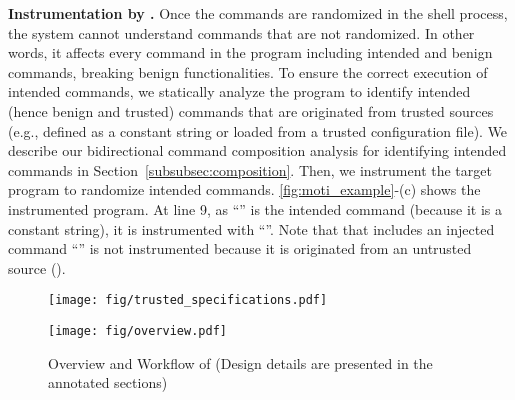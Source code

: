 \noindent
{\bf Instrumentation by \sysname.}
Once the commands are randomized in the shell process, the system cannot understand commands that are not randomized. In other words, it affects every command in the program including intended and benign commands, breaking benign functionalities.
To ensure the correct execution of intended commands, we statically analyze the program to identify intended (hence benign and trusted) commands that are originated from trusted sources (e.g., defined as a constant string or loaded from a trusted configuration file). We describe our bidirectional command composition analysis for identifying intended commands in Section~\ref{subsubsec:composition}. 
Then, we instrument the target program to randomize intended commands.
\autoref{fig:moti_example}-(c) shows the instrumented program. At line 9, as ``'' is the intended command (because it is a constant string), it is  instrumented with ``''. Note that  that includes an injected command ``'' is not instrumented because it is originated from an untrusted source (). %


\begin{figure}[h]
    \centering
    \vspace{1em}
    \texttt{[image: fig/trusted\_specifications.pdf]}
    \vspace{-1em}
    \caption{}
    \vspace{-1em}
    \label{fig:spec_example}
\end{figure}



\begin{figure*}[ht]
    \centering
    \texttt{[image: fig/overview.pdf]}
    \vspace{-0.5em}
     \caption{Overview and Workflow of \sysname (Design details are presented in the annotated sections)}
     \vspace{-1em}
     \label{fig:overview}
\end{figure*}